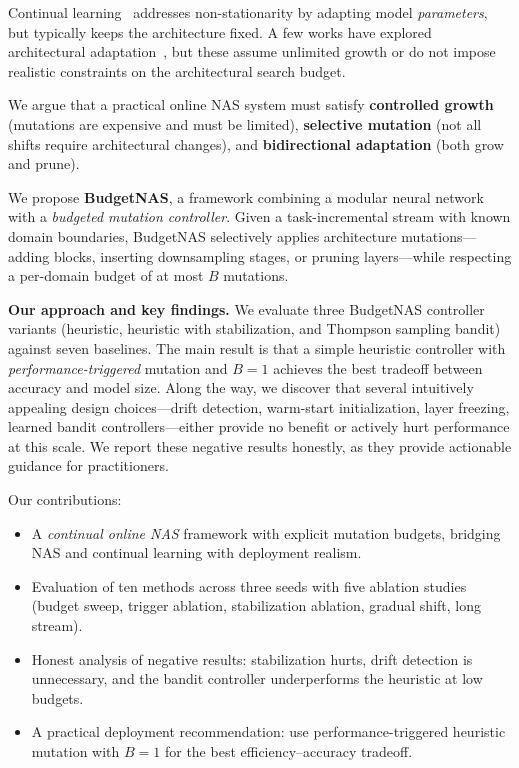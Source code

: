\documentclass[10pt,twocolumn,letterpaper]{article}
\begin{document}
Continual learning~\cite{kirkpatrick2017ewc,chaudhry2019er,yoon2018lifelong} addresses non-stationarity by adapting model \emph{parameters}, but typically keeps the architecture fixed. A few works have explored architectural adaptation~\cite{li2019learn,veniat2021efficient}, but these assume unlimited growth or do not impose realistic constraints on the architectural search budget.

We argue that a practical online NAS system must satisfy \textbf{controlled growth} (mutations are expensive and must be limited), \textbf{selective mutation} (not all shifts require architectural changes), and \textbf{bidirectional adaptation} (both grow and prune).

We propose \textbf{BudgetNAS}, a framework combining a modular neural network with a \emph{budgeted mutation controller}. Given a task-incremental stream with known domain boundaries, BudgetNAS selectively applies architecture mutations---adding blocks, inserting downsampling stages, or pruning layers---while respecting a per-domain budget of at most $B$ mutations.

\textbf{Our approach and key findings.} We evaluate three BudgetNAS controller variants (heuristic, heuristic with stabilization, and Thompson sampling bandit) against seven baselines. The main result is that a simple heuristic controller with \emph{performance-triggered} mutation and $B{=}1$ achieves the best tradeoff between accuracy and model size. Along the way, we discover that several intuitively appealing design choices---drift detection, warm-start initialization, layer freezing, learned bandit controllers---either provide no benefit or actively hurt performance at this scale. We report these negative results honestly, as they provide actionable guidance for practitioners.

Our contributions:
\begin{itemize}
    \item A \emph{continual online NAS} framework with explicit mutation budgets, bridging NAS and continual learning with deployment realism.
    \item Evaluation of ten methods across three seeds with five ablation studies (budget sweep, trigger ablation, stabilization ablation, gradual shift, long stream).
    \item Honest analysis of negative results: stabilization hurts, drift detection is unnecessary, and the bandit controller underperforms the heuristic at low budgets.
    \item A practical deployment recommendation: use performance-triggered heuristic mutation with $B{=}1$ for the best efficiency--accuracy tradeoff.
\end{itemize}
\end{document}
